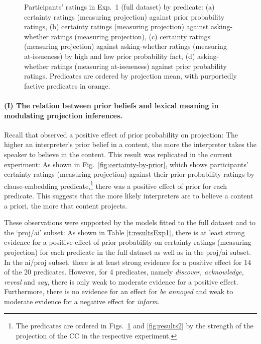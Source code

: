 \documentclass[11pt,fleqn]{article}
\newcommand{\6}{\mbox{$[\hspace*{-.6mm}[$}}
\newcommand{\9}{\mbox{$]\hspace*{-.6mm}]$}}
\begin{document}
\begin{figure}[h!]
\caption{Participants' ratings in Exp.~1 (full dataset) by predicate: (a) certainty ratings (measuring projection) against prior probability ratings, (b) certainty ratings (measuring projection) against asking-whether ratings (measuring projection), (c) certainty ratings (measuring projection) against asking-whether ratings (measuring at-issueness) by high and low prior probability fact, (d) asking-whether ratings (measuring at-issueness) against prior probability ratings. Predicates are ordered by projection mean, with purportedly factive predicates in orange.}\label{fig:results1}
\end{figure}

\paragraph{(I) The relation between prior beliefs and lexical meaning in modulating projection inferences.} Recall that \citealt{degen-tonhauser-openmind} observed a positive effect of prior probability on projection: The higher an interpreter's prior belief in a content, the more the interpreter takes the speaker to believe in the content. This result was replicated in the current experiment: As shown in Fig.~\ref{fig:certainty-by-prior}, which shows participants' certainty ratings (measuring projection) against their prior probability ratings by clause-embedding predicate,\footnote{The predicates are ordered in Figs.~\ref{fig:results1} and \ref{fig:results2} by the strength of the projection of the CC in the respective experiment.} there was a positive effect of prior for each predicate. This suggests that the more likely interpreters are to believe a content a priori, the more that content projects.

These observations were supported by the models fitted to the full dataset and to the `proj/ai' subset: As shown in Table \ref{t:resultsExp1}, there is at least strong evidence for a positive effect of prior probability on certainty ratings (measuring projection) for each predicate in the full dataset as well as in the proj/ai subset. In the ai/proj subset, there is at least strong evidence for a positive effect for 14 of the 20 predicates. However, for 4 predicates, namely {\em discover, acknowledge, reveal} and {\em say}, there is only weak to moderate evidence for a positive effect. Furthermore, there is no evidence for an effect for {\em be annoyed} and weak to moderate evidence for a negative effect for {\em inform}. 
\end{document}
